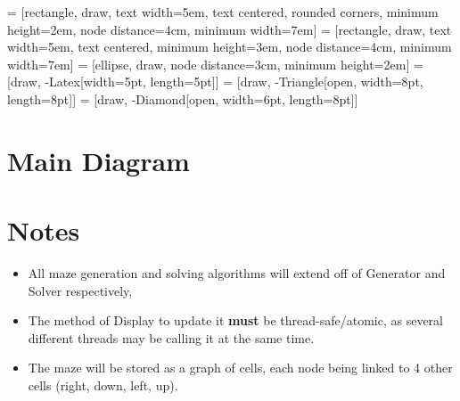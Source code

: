 \documentclass{article}
\begin{document}
\thispagestyle{empty}



\tikzset{line width=10pt}
 = [rectangle, draw,
text width=5em, text centered, rounded corners, minimum height=2em,
node distance=4cm, minimum width=7em]
 = [rectangle, draw,
text width=5em, text centered, minimum height=3em,
node distance=4cm, minimum width=7em]
 = [ellipse, draw, node distance=3cm,
minimum height=2em]
 = [draw, -{Latex[width=5pt, length=5pt]}]
 = [draw, -{Triangle[open, width=8pt, length=8pt]}]
 = [draw, -{Diamond[open, width=6pt, length=8pt]}]
\usetikzlibrary{positioning}

\section{Main Diagram}
\begin{center}
\end{center}

\section{Notes}
\begin{itemize}
    \item All maze generation and solving algorithms will extend off of Generator and Solver respectively,
    \item The method of Display to update it \textbf{must} be thread-safe/atomic, as several different threads may be calling it
          at the same time.
    \item The maze will be stored as a graph of cells, each node being linked to 4 other cells (right, down, left, up).
\end{itemize}
\end{document}
